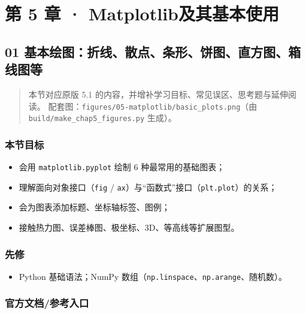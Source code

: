 \chapter{第 5 章 ·
Matplotlib及其基本使用}\label{ux7b2c-5-ux7ae0-matplotlibux53caux5176ux57faux672cux4f7fux7528}

\section{01
基本绘图：折线、散点、条形、饼图、直方图、箱线图等}\label{ux57faux672cux7ed8ux56feux6298ux7ebfux6563ux70b9ux6761ux5f62ux997cux56feux76f4ux65b9ux56feux7bb1ux7ebfux56feux7b49}

\begin{quote}
本节对应原版 5.1 的内容，并增补学习目标、常见误区、思考题与延伸阅读。
配套图：\texttt{figures/05-matplotlib/basic\_plots.png}（由
\texttt{build/make\_chap5\_figures.py} 生成）。
\end{quote}

\subsection{本节目标}\label{ux672cux8282ux76eeux6807-20}

\begin{itemize}
\tightlist
\item
  会用 \texttt{matplotlib.pyplot} 绘制 6 种最常用的基础图表；
\item
  理解面向对象接口（\texttt{fig} /
  \texttt{ax}）与``函数式''接口（\texttt{plt.plot}）的关系；
\item
  会为图表添加标题、坐标轴标签、图例；
\item
  接触热力图、误差棒图、极坐标、3D、等高线等扩展图型。
\end{itemize}

\subsection{先修}\label{ux5148ux4fee-13}

\begin{itemize}
\tightlist
\item
  Python 基础语法；NumPy
  数组（\texttt{np.linspace}、\texttt{np.arange}、随机数）。
\end{itemize}

\subsection{官方文档/参考入口}\label{ux5b98ux65b9ux6587ux6863ux53c2ux8003ux5165ux53e3-2}


